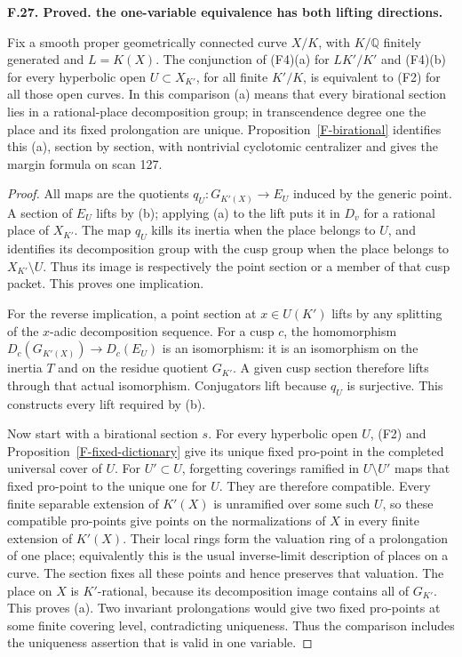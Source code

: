 \documentclass[11pt,oneside]{article}
\makeatletter
\newcounter{statementanchor}
\newenvironment{statement}[3]{%
 \refstepcounter{statementanchor}\def\@currentlabel{#1}%
 \par\addvspace{9pt}\noindent
 \textbf{#1. #2. #3.}\par\nobreak\noindent\ignorespaces
}{\par\addvspace{5pt}}
\makeatother
\begin{document}
\begin{statement}{F.27}{Proved}{the one-variable equivalence has both lifting directions}
\label{st:F.27}
\label{F-birational-equivalence}
Fix a smooth proper geometrically connected curve $X/K$, with
$K/\mathbb Q$ finitely generated and $L=K(X)$. The conjunction
of (F4)(a) for $L K'/K'$ and (F4)(b) for every hyperbolic open
$U\subset X_{K'}$, for all finite $K'/K$, is equivalent to
(F2) for all those open curves. In this comparison (a) means
that every birational section lies in a rational-place
decomposition group; in transcendence degree one the place
and its fixed prolongation are unique. Proposition~\ref{F-birational}
identifies this (a), section by section, with nontrivial
cyclotomic centralizer and gives the margin formula on scan 127.
\end{statement}
\begin{proof}
All maps are the quotients $q_U:G_{K'(X)}\to E_U$ induced by
the generic point. A section of $E_U$ lifts by (b); applying (a)
to the lift puts it in $D_v$ for a rational place of $X_{K'}$.
The map $q_U$ kills its inertia when the place belongs to $U$,
and identifies its decomposition group with the cusp group when
the place belongs to $X_{K'}\setminus U$. Thus its image is
respectively the point section or a member of that cusp packet.
This proves one implication.

For the reverse implication, a point section at $x\in U(K')$
lifts by any splitting of the $x$-adic decomposition sequence.
For a cusp $c$, the homomorphism $D_c(G_{K'(X)})\to D_c(E_U)$
is an isomorphism: it is an isomorphism on the inertia $T$ and
on the residue quotient $G_{K'}$. A given cusp section therefore
lifts through that actual isomorphism. Conjugators lift because
$q_U$ is surjective. This constructs every lift required by (b).

Now start with a birational section $s$. For every hyperbolic
open $U$, (F2) and Proposition~\ref{F-fixed-dictionary} give
its unique fixed pro-point in the completed universal cover of
$U$. For $U'\subset U$, forgetting coverings ramified in
$U\setminus U'$ maps that fixed pro-point to the unique one for
$U$. They are therefore compatible. Every finite separable
extension of $K'(X)$ is unramified over some such $U$, so these
compatible pro-points give points on the normalizations of $X$
in every finite extension of $K'(X)$. Their local rings form the
valuation ring of a prolongation of one place; equivalently this
is the usual inverse-limit description of places on a curve.
The section fixes all these points and hence preserves that
valuation. The place on $X$ is $K'$-rational, because its
decomposition image contains all of $G_{K'}$. This proves (a).
Two invariant prolongations would give two fixed pro-points at
some finite covering level, contradicting uniqueness. Thus the
comparison includes the uniqueness assertion that is valid in
one variable.
\end{proof}
\end{document}
